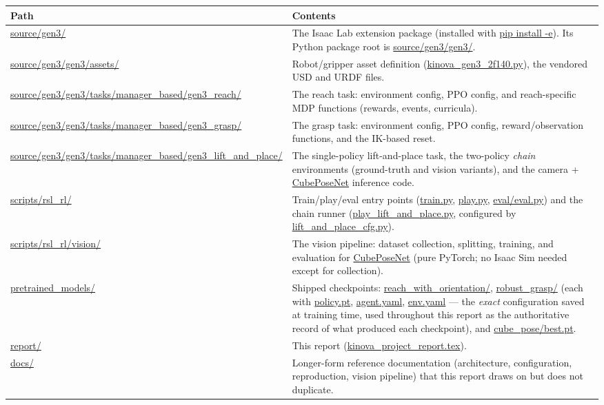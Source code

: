 \documentclass[11pt]{article}
\begin{document}
\begin{center}
\renewcommand{\arraystretch}{1.25}
\begin{tabular}{P{4.6cm}P{9.4cm}}
\toprule
Path & Contents \\
\midrule
\url{source/gen3/} & The Isaac Lab extension package (installed with \url{pip install -e}). Its Python package root is \url{source/gen3/gen3/}. \\
\url{source/gen3/gen3/assets/} & Robot/gripper asset definition (\url{kinova_gen3_2f140.py}), the vendored USD and URDF files. \\
\url{source/gen3/gen3/tasks/manager_based/gen3_reach/} & The reach task: environment config, PPO config, and reach-specific MDP functions (rewards, events, curricula). \\
\url{source/gen3/gen3/tasks/manager_based/gen3_grasp/} & The grasp task: environment config, PPO config, reward/observation functions, and the IK-based reset. \\
\url{source/gen3/gen3/tasks/manager_based/gen3_lift_and_place/} & The single-policy lift-and-place task, the two-policy \emph{chain} environments (ground-truth and vision variants), and the camera + \url{CubePoseNet} inference code. \\
\url{scripts/rsl_rl/} & Train/play/eval entry points (\url{train.py}, \url{play.py}, \url{eval/eval.py}) and the chain runner (\url{play_lift_and_place.py}, configured by \url{lift_and_place_cfg.py}). \\
\url{scripts/rsl_rl/vision/} & The vision pipeline: dataset collection, splitting, training, and evaluation for \url{CubePoseNet} (pure PyTorch; no Isaac Sim needed except for collection). \\
\url{pretrained_models/} & Shipped checkpoints: \url{reach_with_orientation/}, \url{robust_grasp/} (each with \url{policy.pt}, \url{agent.yaml}, \url{env.yaml} --- the \emph{exact} configuration saved at training time, used throughout this report as the authoritative record of what produced each checkpoint), and \url{cube_pose/best.pt}. \\
\url{report/} & This report (\url{kinova_project_report.tex}). \\
\url{docs/} & Longer-form reference documentation (architecture, configuration, reproduction, vision pipeline) that this report draws on but does not duplicate. \\
\bottomrule
\end{tabular}
\end{center}
\end{document}
